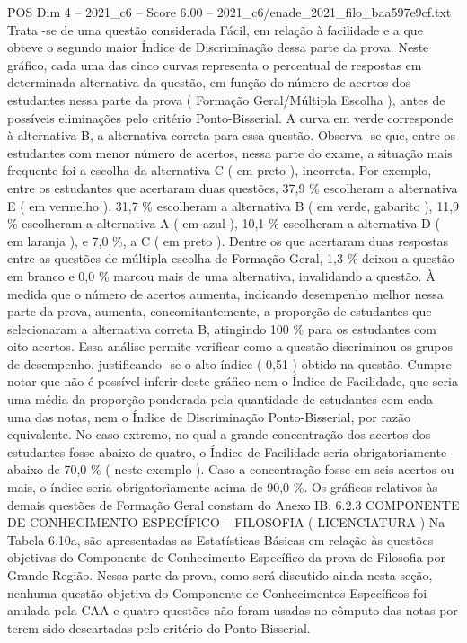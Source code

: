 \begin{textsample}{POS Dim 4 – 2021\_c6 – Score 6.00 – 2021\_c6/enade\_2021\_filo\_baa597e9cf.txt}
Trata -se de uma questão considerada Fácil, em relação à facilidade e a que obteve o segundo maior Índice de Discriminação dessa parte da prova.
Neste gráfico, cada uma das cinco curvas representa o percentual de respostas em determinada alternativa da questão, em função do número de acertos dos estudantes nessa parte da prova ( Formação Geral/Múltipla Escolha ), antes de possíveis eliminações pelo critério Ponto-Bisserial.
A curva em verde corresponde à alternativa B, a alternativa correta para essa questão.
Observa -se que, entre os estudantes com menor número de acertos, nessa parte do exame, a situação mais frequente foi a escolha da alternativa C ( em preto ), incorreta.
Por exemplo, entre os estudantes que acertaram duas questões, 37,9 \% escolheram a alternativa E ( em vermelho ), 31,7 \% escolheram a alternativa B ( em verde, gabarito ), 11,9 \% escolheram a alternativa A ( em azul ), 10,1 \% escolheram a alternativa D ( em laranja ), e 7,0 \%, a C ( em preto ).
Dentre os que acertaram duas respostas entre as questões de múltipla escolha de Formação Geral, 1,3 \% deixou a questão em branco e 0,0 \% marcou mais de uma alternativa, invalidando a questão.
À medida que o número de acertos aumenta, indicando desempenho melhor nessa parte da prova, aumenta, concomitantemente, a proporção de estudantes que selecionaram a alternativa correta B, atingindo 100 \% para os estudantes com oito acertos.
Essa análise permite verificar como a questão discriminou os grupos de desempenho, justificando -se o alto índice ( 0,51 ) obtido na questão.
Cumpre notar que não é possível inferir deste gráfico nem o Índice de Facilidade, que seria uma média da proporção ponderada pela quantidade de estudantes com cada uma das notas, nem o Índice de Discriminação Ponto-Bisserial, por razão equivalente.
No caso extremo, no qual a grande concentração dos acertos dos estudantes fosse abaixo de quatro, o Índice de Facilidade seria obrigatoriamente abaixo de 70,0 \% ( neste exemplo ).
Caso a concentração fosse em seis acertos ou mais, o índice seria obrigatoriamente acima de 90,0 \%.
Os gráficos relativos às demais questões de Formação Geral constam do Anexo IB. 6.2.3 COMPONENTE DE CONHECIMENTO ESPECÍFICO – FILOSOFIA ( LICENCIATURA ) Na Tabela 6.10a, são apresentadas as Estatísticas Básicas em relação às questões objetivas do Componente de Conhecimento Específico da prova de Filosofia por Grande Região.
Nessa parte da prova, como será discutido ainda nesta seção, nenhuma questão objetiva do Componente de Conhecimentos Específicos foi anulada pela CAA e quatro questões não foram usadas no cômputo das notas por terem sido descartadas pelo critério do Ponto-Bisserial.

\end{textsample}
